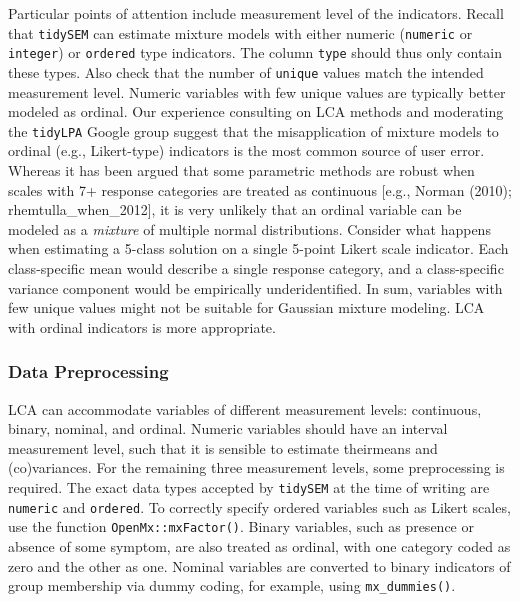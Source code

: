 \documentclass[
  ,man,floatsintext]{apa6}
\begin{document}
Particular points of attention include measurement level of the indicators.
Recall that \texttt{tidySEM} can estimate mixture models with either numeric (\texttt{numeric} or \texttt{integer}) or \texttt{ordered} type indicators.
The column \texttt{type} should thus only contain these types.
Also check that the number of \texttt{unique} values match the intended measurement level.
Numeric variables with few unique values are typically better modeled as ordinal.
Our experience consulting on LCA methods
and moderating the \texttt{tidyLPA} Google group suggest that the
misapplication of mixture models to ordinal (e.g., Likert-type)
indicators is the most common source of user error. Whereas it has been
argued that some parametric methods are robust when scales with 7+
response categories are treated as continuous {[}e.g., Norman (2010); rhemtulla\_when\_2012{]},
it is very unlikely
that an ordinal variable can be modeled as a \emph{mixture} of multiple
normal distributions.
Consider what happens when estimating a 5-class solution on a single 5-point Likert scale indicator.
Each class-specific mean would describe a single response
category,
and a class-specific variance component would be empirically underidentified.
In sum, variables with few unique values might not be suitable for Gaussian mixture modeling.
LCA with ordinal indicators is more appropriate.

\hypertarget{data-preprocessing}{%
\subsubsection{Data Preprocessing}\label{data-preprocessing}}

LCA can accommodate variables of different measurement levels: continuous, binary, nominal, and ordinal.
Numeric variables should have an interval measurement level,
such that it is sensible to estimate theirmeans and (co)variances.
For the remaining three measurement levels,
some preprocessing is required.
The exact data types accepted by \texttt{tidySEM} at the time of writing are \texttt{numeric} and \texttt{ordered}.
To correctly specify ordered variables
such as Likert scales,
use the function \texttt{OpenMx::mxFactor()}.
Binary variables,
such as presence or absence of some symptom, are also treated as ordinal, with one category coded as zero and the other as one.
Nominal variables are converted to binary indicators of group membership via dummy coding, for example, using \texttt{mx\_dummies()}.
\end{document}
